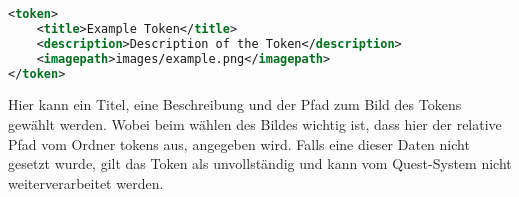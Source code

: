 \begin{lstlisting}[language=XML]
<token>
	<title>Example Token</title>
	<description>Description of the Token</description>
	<imagepath>images/example.png</imagepath>
</token>
\end{lstlisting}
Hier kann ein Titel, eine Beschreibung und der Pfad zum Bild des Tokens gewählt werden. Wobei beim wählen des Bildes wichtig ist, dass hier der relative Pfad vom Ordner tokens aus, angegeben wird. Falls eine dieser Daten nicht gesetzt wurde, gilt das Token als unvollständig und kann vom Quest-System nicht weiterverarbeitet werden.